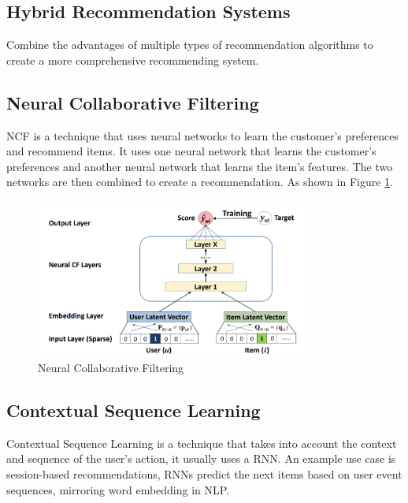 \subsection{Hybrid Recommendation Systems}
Combine the advantages of multiple types of recommendation algorithms to create a more comprehensive recommending system.
\subsection{Neural Collaborative Filtering}
NCF is a technique that uses neural networks to learn the customer's preferences and recommend items. It uses one neural network that learns the customer's preferences and another neural network that learns the item's features. The two networks are then combined to create a recommendation. As shown in Figure \ref{fig:neural-collaborative-filtering}.
\begin{figure}[H]
    \centering
    \includegraphics[width=0.8\textwidth]{assets/neural-collaborative-filtering.png}
    \caption[Neural Collaborative Filtering]{Neural Collaborative Filtering \cite{NvidiaRecSys}}
    \label{fig:neural-collaborative-filtering}
\end{figure}

\subsection{Contextual Sequence Learning}
Contextual Sequence Learning is a technique that takes into account the context and sequence of the user's action, it usually uses a RNN.
An example use case is session-based recommendations, RNNs predict the next items based on user event sequences, mirroring word embedding in NLP.
